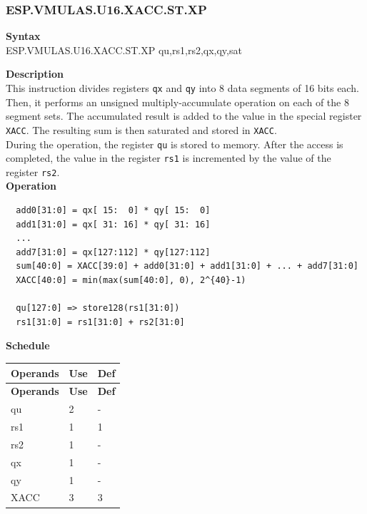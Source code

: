 \newpage
\subsubsection{ESP.VMULAS.U16.XACC.ST.XP}\label{instruction:ESPVMULASU16XACCSTXP}
\textbf{Syntax}\\
ESP.VMULAS.U16.XACC.ST.XP qu,rs1,rs2,qx,qy,sat

\textbf{Description}\\
This instruction divides registers \lstinline{qx} and \lstinline{qy} into 8 data segments of 16 bits each. Then, it performs an unsigned multiply-accumulate operation on each of the 8 segment sets. The accumulated result is added to the value in the special register \lstinline{XACC}. The resulting sum is then saturated and stored in \lstinline{XACC}. \\ During the operation, the register \lstinline{qu} is stored to memory. After the access is completed, the value in the register \lstinline{rs1} is incremented by the value of the register \lstinline{rs2}.\\

\textbf{Operation}
\begin{lstlisting}
  add0[31:0] = qx[ 15:  0] * qy[ 15:  0]
  add1[31:0] = qx[ 31: 16] * qy[ 31: 16]
  ...
  add7[31:0] = qx[127:112] * qy[127:112]
  sum[40:0] = XACC[39:0] + add0[31:0] + add1[31:0] + ... + add7[31:0]
  XACC[40:0] = min(max(sum[40:0], 0), 2^{40}-1)

  qu[127:0] => store128(rs1[31:0])
  rs1[31:0] = rs1[31:0] + rs2[31:0]
\end{lstlisting}

\textbf{Schedule}\\
\begin{longtable}[c]{|l|l|l|}
    \hline
    \rowcolor{lightgray}
    \textbf{Operands} & \textbf{Use} & \textbf{Def} \\\hline
    \endfirsthead
    \hline
    \rowcolor{lightgray}
     \textbf{Operands} & \textbf{Use} & \textbf{Def} \\\hline
    \endhead
    \hline
    \endfoot

    qu & 2 & - \\\hline
    rs1 & 1 & 1 \\\hline
    rs2 & 1 & - \\\hline
     qx & 1 & - \\\hline
     qy & 1 & - \\\hline
     XACC & 3 & 3

\end{longtable}

